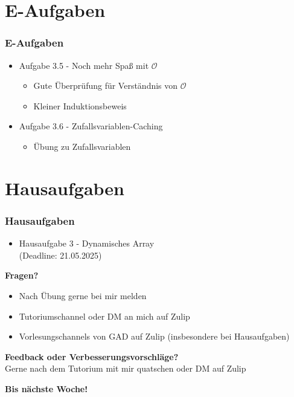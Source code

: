 \documentclass{beamer}
\begin{document}
\section{E-Aufgaben}
\begin{frame}
	\frametitle{E-Aufgaben}
	\begin{itemize}
		\item Aufgabe 3.5 - Noch mehr Spaß mit $\mathcal{O}$ \\
		      \begin{itemize}
			      \item Gute Überprüfung für Verständnis von $\mathcal{O}$
			      \item Kleiner Induktionsbeweis
		      \end{itemize}
		\item Aufgabe 3.6 - Zufallsvariablen-Caching
		      \begin{itemize}
			      \item Übung zu Zufallsvariablen
		      \end{itemize}
	\end{itemize}
\end{frame}

\section{Hausaufgaben}
\begin{frame}
	\frametitle{Hausaufgaben}
	\begin{itemize}
		\item Hausaufgabe 3 - Dynamisches Array \\
		      (Deadline: 21.05.2025)
	\end{itemize}
\end{frame}

\begin{frame}
	\textbf{Fragen?}
	\begin{itemize}
		\item Nach Übung gerne bei mir melden
		\item Tutoriumschannel oder DM an mich auf Zulip
		\item Vorlesungschannels von GAD auf Zulip (insbesondere bei Hausaufgaben)
	\end{itemize}

	\medskip
	\textbf{Feedback oder Verbesserungsvorschläge?} \\
	Gerne nach dem Tutorium mit mir quatschen oder DM auf Zulip

	\medskip
	\textbf{Bis nächste Woche!}
\end{frame}

\end{document}
